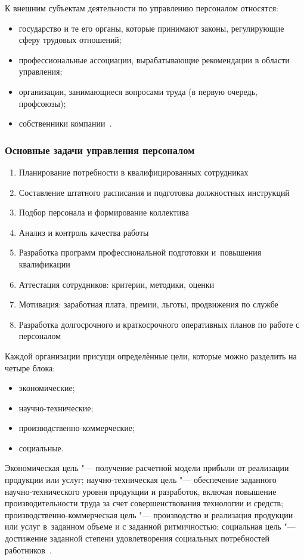 \documentclass{../industrial-development}
\begin{document}
К внешним субъектам деятельности по управлению персоналом относятся:
\begin{itemize} 
\item	государство и те его органы, которые принимают законы, регулирующие сферу трудовых отношений;
\item	профессиональные ассоциации, вырабатывающие рекомендации в области управления;
\item	организации, занимающиеся вопросами труда (в первую очередь, профсоюзы);
\item	собственники компании~\cite[с.~83--84]{Maslova}.
\end{itemize} 

\begin{frame} \frametitle{Основные задачи управления персоналом}
  \begin{enumerate}
  \item Планирование потребности в квалифицированных сотрудниках
  \item Составление штатного расписания и подготовка должностных инструкций
	\item Подбор персонала и формирование коллектива
	\item Анализ и контроль качества работы 
	\item Разработка программ профессиональной подготовки и~повышения квалификации
	\item Аттестация сотрудников: критерии, методики, оценки
	\item Мотивация: заработная плата, премии, льготы, продвижения по службе
	\item Разработка долгосрочного и краткосрочного оперативных планов по работе с персоналом
    \end{enumerate}
\end{frame}

\lecturenotes

Каждой организации присущи определённые цели, которые можно разделить на четыре блока:

\begin{itemize}
\item	экономические;
\item	научно-технические;
\item	производственно-коммерческие;
\item	социальные.
\end{itemize}

\alert{Экономическая цель} "--- получение расчетной модели прибыли от реализации продукции или услуг; \alert{научно-техническая цель} "--- обеспечение заданного научно-технического уровня продукции и разработок, включая повышение производительности труда за счет совершенствования технологии и средств; 
\alert{производственно-коммерческая цель} "--- производство и реализация продукции или услуг в~заданном объеме и с заданной ритмичностью; \alert{социальная цель} "--- достижение заданной степени удовлетворения социальных потребностей работников~\cite[с.~84--85]{Maslova}.
\end{document}
